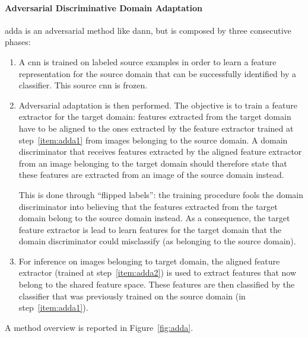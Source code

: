 \documentclass[%
    corpo=12pt,
    twoside,
    stile=classica,   
    tipotesi=magistrale,
    evenboxes,
    english,
	numerazioneromana,
]{toptesi}
\begin{document}
\paragraph{Adversarial Discriminative Domain Adaptation}\label{sec:adda}
\gls{adda}\cite{tzeng2017adversarial} is an adversarial method like \gls{dann}, but is composed by three consecutive phases:
\begin{enumerate}
	\item \label{item:adda1} A \gls{cnn} is trained on labeled source examples in order to learn a feature representation for the source domain that can be successfully identified by a classifier. This source \gls{cnn} is frozen.
	
	\item \label{item:adda2} Adversarial adaptation is then performed.
	The objective is to train a feature extractor for the target domain: features extracted from the target domain have to be aligned to the ones extracted by the feature extractor trained at step~\ref{item:adda1} from images belonging to the source domain. A domain discriminator that receives features extracted by the aligned feature extractor from an image belonging to the target domain should therefore state that these features are extracted from an image of the source domain instead.
	
	This is done through \textquotedblleft flipped labels\textquotedblright : the training procedure fools the domain discriminator into believing that the features extracted from the target domain belong to the source domain instead. As a consequence, the target feature extractor is lead to learn features for the target domain that the domain discriminator could misclassify (as belonging to the source domain).
	
	\item For inference on images belonging to target domain, the aligned feature extractor (trained at step~\ref{item:adda2}) is used to extract features that now belong to the shared feature space. These features are then classified by the classifier that was previously trained on the source domain (in step~\ref{item:adda1}).
\end{enumerate}
A method overview is reported in Figure~\ref{fig:adda}.
\end{document}
